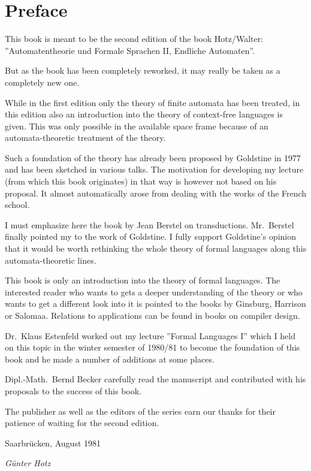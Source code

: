 \chapter*{Preface}

This book is meant to be the second edition of the book Hotz/Walter:
''Automatentheorie und Formale Sprachen II, Endliche Automaten''.


But as the book has been completely reworked, it may really be taken as a
completely new one.

While in the first edition only the theory of finite automata has been treated,
in this edition also an introduction into the theory of context-free languages
is given. This was only possible in the available space frame because
of an automata-theoretic treatment of the theory.

Such a foundation of the theory has already been proposed by Goldstine in 1977
and has been sketched in various talks. The motivation for developing
my lecture (from which this book originates) in that way is however not based on
his proposal. It almost automatically arose from dealing with the works of the
French school.


I must emphasize here the book by Jean Berstel on
transductions. Mr.\ Berstel finally pointed my to the work of Goldstine. I fully
support Goldstine's opinion that it would be worth rethinking the whole theory of formal languages along this automata-theoretic lines.

This book is only an introduction into the theory of formal languages. The
interested reader who wants to gets a deeper understanding of the theory or who
wants to get a different look into it is pointed to the books by Ginsburg,
Harrison or Salomaa. Relations to applications can be found in books on compiler
design.

Dr.\ Klaus Estenfeld worked out my lecture ''Formal Languages I'' which I held 
on this topic in the winter semester of 1980/81 to become the foundation of this
book and he made a number of additions at some places.

Dipl.-Math.\ Bernd Becker carefully read the manuscript and contributed with his
proposals to the success of this book.

The publisher as well as the editors of the series earn our thanks for their
patience of waiting for the second edition.

Saarbrücken, August 1981

\vspace{1em}
{\em Günter Hotz}
